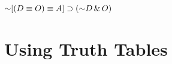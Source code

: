 \begin{exercises}
%	


\item	$\mathord{\sim} [(D \equiv O) \equiv A] \supset (\mathord{\sim} D \,\&\, O) $



\end{exercises}



\section{Using Truth Tables}

